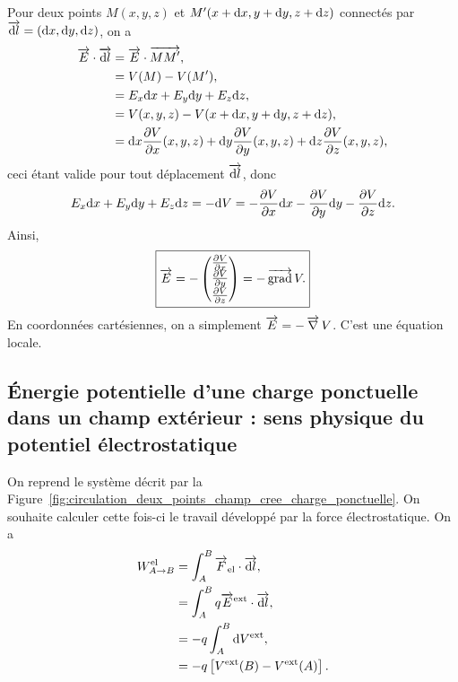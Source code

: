         Pour deux points $M(x,y,z)$ et $M'(x+\mathrm{d} x,y+\mathrm{d} y,z+\mathrm{d} z)$ connectés par $\protect\overrightarrow{{\mathrm{d} l}}=(\mathrm{d} x,\mathrm{d} y, \mathrm{d} z)$, on a
        \begin{align*}
            \protect\overrightarrow{{E}}\cdot\protect\overrightarrow{{\mathrm{d} l}}
            &=
            \protect\overrightarrow{{E}}\cdot\protect\overrightarrow{{MM'}},\\
            &=
            V(M)-V(M'),\\
            &=
            E_x\mathrm{d} x+E_y\mathrm{d} y+E_z\mathrm{d} z,\\
            &=
            V(x,y,z)-V(x+\mathrm{d} x,y+\mathrm{d} y,z+\mathrm{d} z),\\
            &=\mathrm{d} x\frac{\partial V}{\partial x}(x,y,z)+\mathrm{d} y\frac{\partial V}{\partial y}(x,y,z)+\mathrm{d} z\frac{\partial V}{\partial z}(x,y,z),
        \end{align*}
        ceci étant valide pour tout déplacement $\protect\overrightarrow{{\mathrm{d} l}}$, donc 
        \begin{equation*}
            E_x\mathrm{d} x+E_y\mathrm{d} y+E_z\mathrm{d} z=-\mathrm{d} V=-\frac{\partial V}{\partial x}\mathrm{d} x-\frac{\partial V}{\partial y}\mathrm{d} y-\frac{\partial V}{\partial z}\mathrm{d} z.
        \end{equation*}
        Ainsi, 
        \begin{equation*}
            \boxed{
                \protect\overrightarrow{{E}}=-\begin{pmatrix}
                    \frac{\partial V}{\partial x}\\
                    \frac{\partial V}{\partial y}\\
                    \frac{\partial V}{\partial z}
                \end{pmatrix}
                =-\operatorname{\overrightarrow{\text{grad}}} V.
            }
        \end{equation*}
        En coordonnées cartésiennes, on a simplement $\protect\overrightarrow{{E}}=-\operatorname{\overrightarrow{\nabla}} V$. C'est une équation locale.

    \subsection{Énergie potentielle d'une charge ponctuelle dans un champ extérieur : sens physique du potentiel électrostatique}

        On reprend le système décrit par la Figure~\ref{fig:circulation_deux_points_champ_cree_charge_ponctuelle}. On souhaite calculer cette fois-ci le travail développé par la force électrostatique. On a 
        \begin{align*}
            W_{A\to B}^{\text{el}}
            &=
            \int_{A}^{B} \protect\overrightarrow{{F}}_{\text{el}}\cdot\protect\overrightarrow{{\mathrm{d} l}},\\
            &=
            \int_{A}^{B}q\protect\overrightarrow{{E}}^{\text{ext}}\cdot\protect\overrightarrow{{\mathrm{d} l}},\\
            &=
            -q\int_{A}^{B}\mathrm{d} V^{\text{ext}},\\
            &=
            -q\left[
                V^{\text{ext}}(B)-V^{\text{ext}}(A)
            \right].
        \end{align*}

